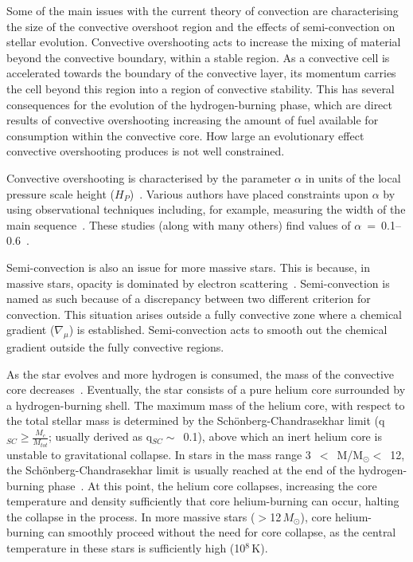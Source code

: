 {Some of the main issues with the current theory of convection are characterising the size of the convective overshoot region and the effects of semi-convection on stellar evolution.
Convective overshooting acts to increase the mixing of material beyond the convective boundary, within a stable region.
As a convective cell is accelerated towards the boundary of the convective layer, its momentum carries the cell beyond this region into a region of convective stability.
This has several consequences for the evolution of the hydrogen-burning phase, which are direct results of convective overshooting increasing the amount of fuel available for consumption within the convective core.
How large an evolutionary effect convective overshooting produces is not well constrained.

Convective overshooting is characterised by the parameter $\alpha$ in units of the local pressure scale height ($H_{P}$)~\citep{2012sse..book.....K}.
Various authors have placed constraints upon $\alpha$ by using observational techniques including, for example, measuring the width of the main sequence~\citep{Schroder97,Brott11}.
These studies (along with many others) find values of $\alpha$~=~0.1--0.6~\citep[a recent example is][finding $\alpha = 0.335$]{Brott11}.

Semi-convection is also an issue for more massive stars.
This is because, in massive stars, opacity is dominated by electron scattering~\citep{b:Bohm-vitense92.v3}.
Semi-convection is named as such because of a discrepancy between two different criterion for convection.
This situation arises outside a fully convective zone where a chemical gradient ($\nabla _{\mu}$) is established.
Semi-convection acts to smooth out the chemical gradient outside the fully convective regions.


As the star evolves and more hydrogen is consumed, the mass of the convective core decreases~\citep{2012sse..book.....K}.
Eventually, the star consists of a pure helium core surrounded by a hydrogen-burning shell.
The maximum mass of the helium core, with respect to the total stellar mass is determined by the Sch\"onberg-Chandrasekhar limit
(q$_{SC}\geq\frac{M_{c}}{M_{tot}}$; usually derived as q$_{SC}\sim$~0.1), above which an inert helium core is unstable to gravitational collapse.
In stars in the mass range 3~$<$~M/M$_{\odot}<$~12, the Sch\"onberg-Chandrasekhar limit is usually reached at the end of the hydrogen-burning phase~\citep{b:SalarisCassisi05}.
At this point, the helium core collapses, increasing the core temperature and density sufficiently that core helium-burning can occur, halting the collapse in the process.
In more massive stars ($>$12\,$M_{\odot}$), core helium-burning can smoothly proceed without the need for core collapse, as the central temperature in these stars is sufficiently high (10$^{8}$\,K).

}
